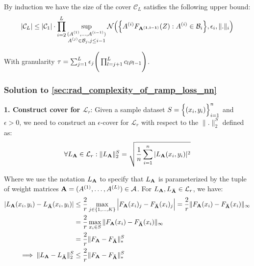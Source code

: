 \begin{proof*}
    \noindent By induction we have the size of the cover $\mathcal{C}_L$ satisfies the following upper bound:
    \begin{align*}
        |\mathcal{C}_L| \le |\mathcal{C}_1|\cdot\prod_{i=2}^L\sup_{
            \substack{
                (A^{(1)}, \dots, A^{(i-1)})\\
                A^{(j)}\in\mathcal{B}_j, j\le i-1
            }
        }\mathcal{N}\Big( 
            \Big\{ 
                A^{(i)}F_{\bf A^{(1, i-1)}}(Z) : A^{(i)}\in\mathcal{B}_i
             \Big\}, \epsilon_i, \|.\|_i
         \Big)
    \end{align*}

    \noindent With granularity $\tau=\sum_{j=1}^L\epsilon_j\Bigg( \prod_{l=j+1}^L c_l\rho_{l-1} \Bigg)$.
\end{proof*}


\subsubsection{Solution to \ref{sec:rad_complexity_of_ramp_loss_nn}}
\textbf{1. Construct cover for $\mathcal{L}_r$}: Given a sample dataset $S=\Big\{ (x_i, y_i) \Big\}_{i=1}^n$ and $\epsilon>0$, we need to construct an $\epsilon$-cover for $\mathcal{L}_r$ with respect to the $\|.\|_2^S$ defined as:
\begin{align*}
    \forall L_{\bf A} \in \mathcal{L}_r : \|L_{\bf A}\|_2^S = \sqrt{
        \frac{1}{n}\sum_{i=1}^n |L_{\bf A}(x_i, y_i)|^2
    }
\end{align*}

\noindent Where we use the notation $L_{\bf A}$ to specify that $L_{\bf A}$ is parameterized by the tuple of weight matrices ${\bf A}=(A^{(1)}, \dots, A^{(L)})\in\mathcal{A}$. For $L_{\bf A},L_{\bf \bar A}\in\mathcal{L}_r$, we have:
\begin{align*}
    |L_{\bf A}(x_i, y_i) - L_{\bf \bar A}(x_i, y_i)| &\le \frac{2}{r}\max_{j\in\{1, \dots, K\}} \Big| 
        F_{\bf A}(x_i)_j - F_{\bf \bar A}(x_i)_j
     \Big| = \frac{2}{r}\|F_{\bf A}(x_i) - F_{\bf \bar A}(x_i)\|_\infty \\
    &= \frac{2}{r}\max_{x_i \in S} \|F_{\bf A}(x_i) - F_{\bf \bar A}(x_i)\|_\infty \\
    &= \frac{2}{r} \|F_{\bf A} - F_{\bf \bar A}\|_*^S\\
    \implies 
    \|L_{\bf A} - L_{\bf \bar A}\|_2^S &\le \frac{2}{r}\|F_{\bf A} - F_{\bf \bar A}\|_*^S
\end{align*}

